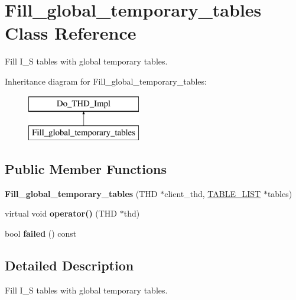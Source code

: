 \hypertarget{classFill__global__temporary__tables}{}\section{Fill\+\_\+global\+\_\+temporary\+\_\+tables Class Reference}
\label{classFill__global__temporary__tables}


Fill I\+\_\+S tables with global temporary tables.  


Inheritance diagram for Fill\+\_\+global\+\_\+temporary\+\_\+tables\+:\begin{figure}[H]
\begin{center}
\leavevmode
\includegraphics[height=2.000000cm]{classFill__global__temporary__tables}
\end{center}
\end{figure}
\subsection*{Public Member Functions}
\begin{DoxyCompactItemize}
\item 
\mbox{\label{classFill__global__temporary__tables_aabcb751986e9b369447c993c883674b9}} 
{\bfseries Fill\+\_\+global\+\_\+temporary\+\_\+tables} (T\+HD $\ast$client\+\_\+thd, \mbox{\hyperlink{structTABLE__LIST}{T\+A\+B\+L\+E\+\_\+\+L\+I\+ST}} $\ast$tables)
\item 
\mbox{\label{classFill__global__temporary__tables_a5337ea1a5da3ddd8c01d01334e10cc0c}} 
virtual void {\bfseries operator()} (T\+HD $\ast$thd)
\item 
\mbox{\label{classFill__global__temporary__tables_a5acdcfe27c3bb680e38f932e967f7d1e}} 
bool {\bfseries failed} () const
\end{DoxyCompactItemize}


\subsection{Detailed Description}
Fill I\+\_\+S tables with global temporary tables. 


